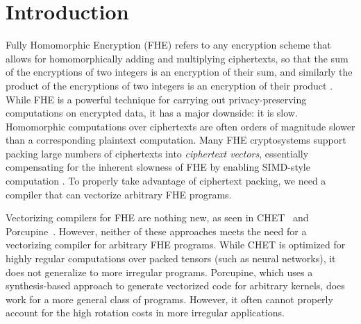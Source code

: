 \section{Introduction}\label{sec:intro}

Fully Homomorphic Encryption (FHE) refers to any encryption scheme that allows for homomorphically adding and multiplying ciphertexts, so that the sum of the encryptions of two integers is an encryption of their sum, and similarly the product of the encryptions of two integers is an encryption of their product \cite{Gentry}.
While FHE is a powerful technique for carrying out privacy-preserving computations on encrypted data, it has a major downside: it is slow.
Homomorphic computations over ciphertexts are often orders of magnitude slower than a corresponding plaintext computation.
Many FHE cryptosystems support packing large numbers of ciphertexts into {\em ciphertext vectors}, essentially compensating for the inherent slowness of FHE by enabling SIMD-style computation \cite{BrakerskiPacking,SmartPacking}.
To properly take advantage of ciphertext packing, we need a compiler that can vectorize arbitrary FHE programs.

Vectorizing compilers for FHE are nothing new, as seen in CHET~\cite{CHET} and Porcupine~\cite{Porcupine}.
However, neither of these approaches meets the need for a vectorizing compiler for arbitrary FHE programs.
While CHET is optimized for highly regular computations over packed tensors (such as neural networks), it does not generalize to more irregular programs. 
Porcupine, which uses a synthesis-based approach to generate vectorized code for arbitrary kernels, does work for a more general class of programs.
However, it often cannot properly account for the high rotation costs in more irregular applications. 


